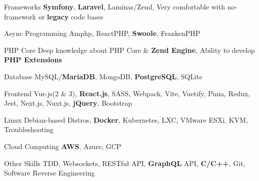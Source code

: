 
\begin{cvskills}

  \cvskill
    {Frameworks}
    {\textbf{Symfony}, \textbf{Laravel}, Laminas/Zend, Very comfortable with no-framework or \textbf{legacy} code bases}

  \cvskill
    {Async Programming}
    {Amphp, ReactPHP, \textbf{Swoole}, FrankenPHP}

  \cvskill
    {PHP Core}
    {Deep knowledge about PHP Core \& \textbf{Zend Engine}, Ability to develop \textbf{PHP Extensions}}
  
  \cvskill
    {Database}
    {MySQL/\textbf{MariaDB}, MongoDB, \textbf{PostgreSQL}, SQLite}

  \cvskill
    {Frontend} %
    {Vue.js(2 \& 3), \textbf{React.js}, SASS, Webpack, Vite, Vuetify, Pinia, Redux, Jest, Next.js, Nuxt.js, \textbf{jQuery}, Bootstrap} %

  \cvskill
    {Linux} %
    {Debian-based Distros, \textbf{Docker}, Kubernetes, LXC, VMware ESXi, KVM, Troubleshooting} %
    
  \cvskill
    {Cloud Computing} %
    {\textbf{AWS}, Azure, GCP} %

  \cvskill
    {Other Skills} %
    {TDD, Websockets, RESTful API, \textbf{GraphQL} API, \textbf{C/C++}, Git, Software Reverse Engineering} %

\end{cvskills}
